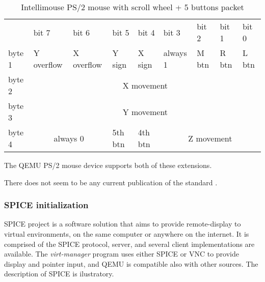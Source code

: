 \begin{table}[H]
    \begin{tabular}{lllllllll}
        & bit 7 & bit 6 & bit 5 & bit 4 & bit 3 & bit 2 & bit 1 & bit 0 \\

        \cline{2-9} 

        \multicolumn{1}{l|}{byte 1}     & \multicolumn{1}{l|}{Y overflow}   &
        \multicolumn{1}{l|}{X overflow} & \multicolumn{1}{l|}{Y sign}       &
        \multicolumn{1}{l|}{X sign}     & \multicolumn{1}{l|}{always 1}     &
        \multicolumn{1}{l|}{M btn}      & \multicolumn{1}{l|}{R btn}        &
        \multicolumn{1}{l|}{L btn} \\

        \cline{2-9} 

        \multicolumn{1}{l|}{byte 2} & \multicolumn{8}{c|}{X movement} \\

        \cline{2-9} 

        \multicolumn{1}{l|}{byte 3} & \multicolumn{8}{c|}{Y movement} \\

        \cline{2-9} 

        \multicolumn{1}{l|}{byte 4}     & \multicolumn{2}{c|}{always 0} &
        \multicolumn{1}{l|}{5th btn}    & \multicolumn{1}{l|}{4th btn}  &
        \multicolumn{4}{c|}{Z movement} \\

        \cline{2-9} 
    \end{tabular}
    \caption{Intellimouse PS/2 mouse with scroll wheel + 5 buttons packet \cite{ps2interface}}
    \label{table:imps25buttons}
\end{table}

\noindent
The QEMU PS/2 mouse device supports both of these extensions.

There does not seem to be any current publication of the standard
\cite{ps2interface}.

\subsubsection{SPICE initialization}

SPICE project is a software solution that aims to provide remote-display to
virtual environments, on the same computer or anywhere on the internet.  It is
comprised of the SPICE protocol, server, and several client implementations are
available.  The \emph{virt-manager} program uses either SPICE or VNC to provide
display and pointer input, and QEMU is compatible also with other sources.  The
description of SPICE is ilustratory. %

